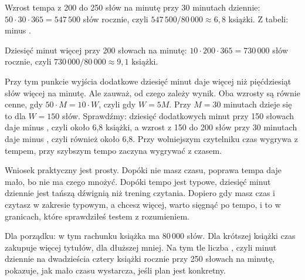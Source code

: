 \begin{przyklad}
Wzrost tempa z 200 do 250 słów na minutę przy 30 minutach dziennie:
$50 \cdot 30 \cdot 365 = 547\,500$ słów rocznie, czyli $547\,500 / 80\,000 \approx 6{,}8$ książki. Z tabeli:  minus .

Dziesięć minut więcej przy 200 słowach na minutę:
$10 \cdot 200 \cdot 365 = 730\,000$ słów rocznie, czyli $730\,000 / 80\,000 \approx 9{,}1$ książki.

Przy tym punkcie wyjścia dodatkowe dziesięć minut daje więcej niż pięćdziesiąt słów więcej na minutę. Ale zauważ, od czego zależy wynik. Oba wzrosty są równie cenne, gdy $50 \cdot M = 10 \cdot W$, czyli gdy $W = 5M$. Przy $M = 30$ minutach dzieje się to dla $W = 150$ słów. Sprawdźmy: dziesięć dodatkowych minut przy 150 słowach daje  minus , czyli około 6,8 książki, a wzrost z 150 do 200 słów przy 30 minutach daje  minus , czyli również około 6,8. Przy wolniejszym czytelniku czas wygrywa z tempem, przy szybszym tempo zaczyna wygrywać z czasem.
\end{przyklad}

Wniosek praktyczny jest prosty. Dopóki nie masz czasu, poprawa tempa daje mało, bo nie ma czego mnożyć. Dopóki tempo jest typowe, dziesięć minut dziennie jest tańszą dźwignią niż trening czytania. Dopiero gdy masz czas i czytasz w zakresie typowym, a chcesz więcej, warto sięgnąć po tempo, i to w granicach, które sprawdziłeś testem z rozumieniem.

Dla porządku: w tym rachunku książka ma 80\,000 słów. Dla krótszej książki czas zakupuje więcej tytułów, dla dłuższej mniej. Na tym tle liczba , czyli minut dziennie na dwadzieścia cztery książki rocznie przy 250 słowach na minutę, pokazuje, jak mało czasu wystarcza, jeśli plan jest konkretny.

